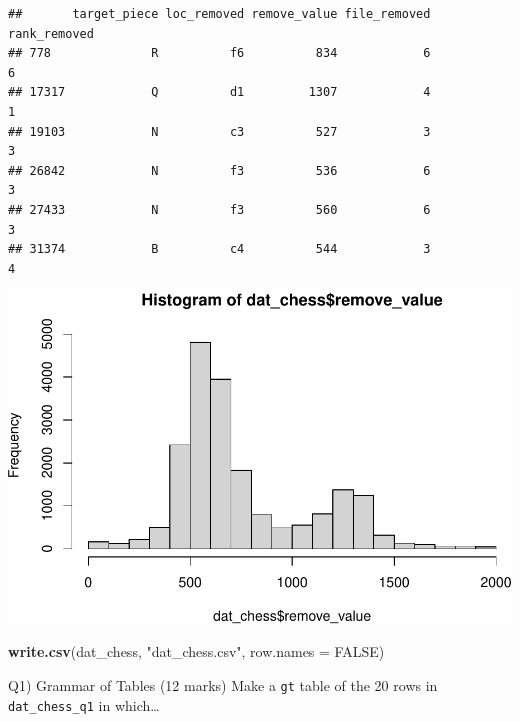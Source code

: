 \documentclass[
]{article}
\newenvironment{Shaded}{\begin{snugshade}}{\end{snugshade}}
\newcommand{\AttributeTok}[1]{\textcolor[rgb]{0.13,0.29,0.53}{#1}}
\newcommand{\ConstantTok}[1]{\textcolor[rgb]{0.56,0.35,0.01}{#1}}
\newcommand{\FunctionTok}[1]{\textcolor[rgb]{0.13,0.29,0.53}{\textbf{#1}}}
\newcommand{\NormalTok}[1]{#1}
\newcommand{\SpecialCharTok}[1]{\textcolor[rgb]{0.81,0.36,0.00}{\textbf{#1}}}
\newcommand{\StringTok}[1]{\textcolor[rgb]{0.31,0.60,0.02}{#1}}
\begin{document}
\begin{verbatim}
##       target_piece loc_removed remove_value file_removed rank_removed
## 778              R          f6          834            6            6
## 17317            Q          d1         1307            4            1
## 19103            N          c3          527            3            3
## 26842            N          f3          536            6            3
## 27433            N          f3          560            6            3
## 31374            B          c4          544            3            4
\end{verbatim}

\begin{Shaded}
\end{Shaded}

\includegraphics{STAT842_Assignment2_files/figure-latex/unnamed-chunk-2-1.pdf}

\begin{Shaded}
\begin{Highlighting}[]
\FunctionTok{write.csv}\NormalTok{(dat\_chess, }\StringTok{"dat\_chess.csv"}\NormalTok{, }\AttributeTok{row.names =} \ConstantTok{FALSE}\NormalTok{)}
\end{Highlighting}
\end{Shaded}

\newpage

Q1) Grammar of Tables (12 marks) Make a \texttt{gt} table of the 20 rows
in \texttt{dat\_chess\_q1} in which\ldots{}
\end{document}
